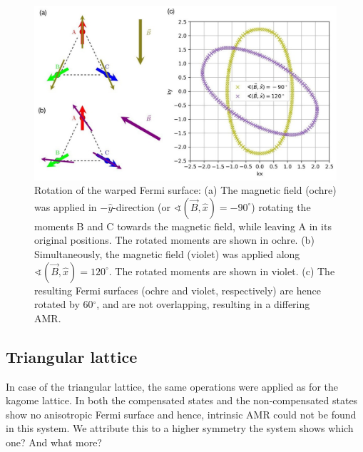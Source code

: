 \documentclass[prb,showpacs,amsmath,amssymb,superscriptaddress,twocolumn,floatfix]{revtex4-1}
\begin{document}
\begin{figure}
	\centering
	\includegraphics[width=1\linewidth]{img/FS-rotation}
	\caption{Rotation of the warped Fermi surface: 
	(a) The magnetic field (ochre) was applied in $-\hat{y}$-direction (or $\sphericalangle (\vec{B}, \hat{x}) = -90^\circ$) rotating the moments B and C towards the magnetic field, while leaving A in its original positions. The rotated moments are shown in ochre. (b) Simultaneously, the magnetic field (violet) was applied along $\sphericalangle (\vec{B}, \hat{x}) = 120^\circ$. The rotated moments are shown in violet. (c) The resulting Fermi surfaces (ochre and violet, respectively) are hence rotated by 60$^\circ$, and are not overlapping, resulting in a differing AMR.}
	\label{fig:fs-rotation}
\end{figure}



\subsection{Triangular lattice}
\label{sec_I_triangular}

In case of the triangular lattice, the same operations were applied as for the kagome lattice. In both the compensated states and the non-compensated states show no anisotropic Fermi surface and hence, intrinsic AMR could not be found in this system. We attribute this to a higher symmetry the system shows {\color{red} which one? And what more?}
\end{document}
